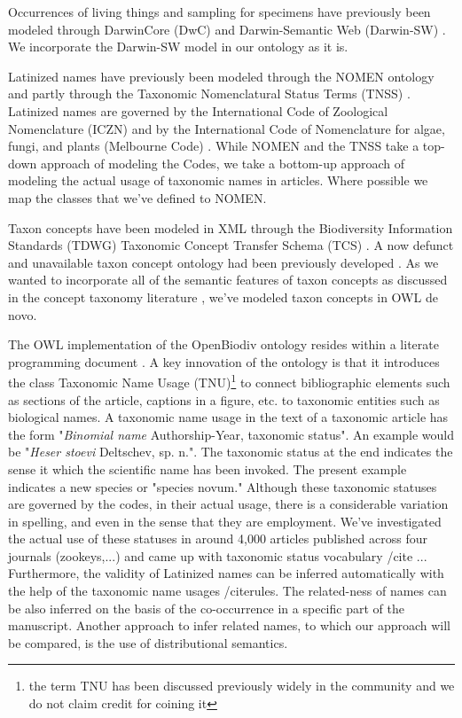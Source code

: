 \documentclass{bmcart}
\begin{document}
Occurrences of living things and sampling for specimens have previously been modeled through DarwinCore (DwC) and Darwin-Semantic Web (Darwin-SW) \cite{baskauf_darwin-sw:_2016, wieczorek_darwin_2012}. We incorporate the Darwin-SW model in our ontology as it is.

Latinized names have previously been modeled through the NOMEN ontology \cite{dmitriev_nomen_nodate} and partly through the Taxonomic Nomenclatural Status Terms (TNSS) \cite{morris_taxonomic_nodate}. Latinized names are governed by the International Code of Zoological Nomenclature (ICZN) \cite{iczn1999} and by the International Code of Nomenclature for algae, fungi, and plants (Melbourne Code) \cite{mcneill_international_2012}. While NOMEN and the TNSS take a top-down approach of modeling the Codes, we take a bottom-up approach of modeling the actual usage of taxonomic names in articles. Where possible we map the classes that we've defined to NOMEN.

Taxon concepts have been modeled in XML through the Biodiversity Information Standards (TDWG) Taxonomic Concept Transfer Schema (TCS) \cite{tdwg_taxon_concept}. A now defunct and unavailable taxon concept ontology had been previously developed \cite{devries_taxon_nodate}. As we wanted to incorporate all of the semantic features of taxon concepts as discussed in the concept taxonomy literature \cite{berendsohn_concept_1995, franz_perspectives:_2009, sterner_taxonomy_2017}, we've modeled taxon concepts in OWL de novo.

The OWL implementation of the OpenBiodiv ontology resides within a literate programming document \cite{rdf_guide}. A key innovation of the ontology is that it introduces the class Taxonomic Name Usage (TNU)\footnote{the term TNU has been discussed previously widely in the community and we do not claim credit for coining it} to connect bibliographic elements such as sections of the article, captions in a figure, etc. to taxonomic entities such as biological names. A taxonomic name usage in the text of a taxonomic article has the form "\emph{Binomial name} Authorship-Year, taxonomic status". An example would be "\emph{Heser stoevi} Deltschev, sp. n.". The taxonomic status at the end indicates the sense it which the scientific name has been invoked. The present example indicates a new species or "species novum." Although these taxonomic statuses are governed by the codes, in their actual usage, there is a considerable variation in spelling, and even in the sense that they are employment. We've investigated the actual use of these statuses in around 4,000 articles published across four journals (zookeys,...) and came up with taxonomic status vocabulary /cite{ ...} Furthermore, the validity of Latinized names can be inferred automatically with the help of the taxonomic name usages /cite{rules}. The related-ness of names can be also inferred on the basis of the co-occurrence in a specific part of the manuscript. Another approach to infer related names, to which our approach will be compared, is the use of distributional semantics.
\end{document}
